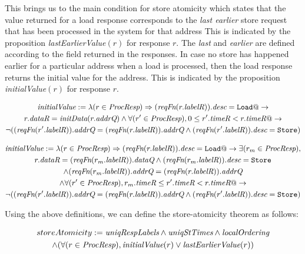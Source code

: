 This brings us to the main condition for store atomicity which states that the
value returned for a load response corresponds to the \emph{last earlier} store
request that has been processed in the system for that address This is
indicated by the proposition \textit{lastEarlierValue}$(r)$ for response $r$.
The \emph{last} and \emph{earlier} are defined according to the field \timeR{}
returned in the responses. In case no store has happened earlier for a
particular address when a load is processed, then the load response returns the
initial value for the address. This is indicated by the proposition
\textit{initialValue}$(r)$ for response $r$.
\begin{defn}
\small
\begin{multline*}
\textit{initialValue} := \lambda (r \in \textit{ProcResp}) \Rightarrow
(\textit{reqFn} (r.\textit{labelR})).\textit{desc} = \texttt{Load} @->\\ r.\textit{dataR} = \textit{initData} (r.\textit{addrQ}) \wedge 
\forall (r' \in \textit{ProcResp}), 0 \le r'.\textit{timeR} < r.\textit{timeR} @->\\
\neg ((\textit{reqFn} (r'.\textit{labelR})).\textit{addrQ} = (\textit{reqFn} (r.\textit{labelR})).\textit{addrQ} \wedge (\textit{reqFn} (r'.\textit{labelR})).\textit{desc} = \texttt{Store})
\end{multline*}
\end{defn}

\begin{defn}
\small
\begin{multline*}
\textit{initialValue} := \lambda (r \in \textit{ProcResp}) \Rightarrow
(\textit{reqFn} (r.\textit{labelR})).\textit{desc} = \texttt{Load} @->
\exists (r_m \in \textit{ProcResp}),\\ r.\textit{dataR} = (\textit{reqFn} (r_m.\textit{labelR})).\textit{dataQ} \wedge 
(\textit{reqFn} (r_m.\textit{labelR})).\textit{desc} = \texttt{Store} \\ \wedge (\textit{reqFn} (r_m.\textit{labelR})).\textit{addrQ} = (\textit{reqFn} (r.\textit{labelR})).\textit{addrQ}\\ \wedge
\forall (r' \in \textit{ProcResp}), r_m.\textit{timeR} \le r'.\textit{timeR} < r.\textit{timeR} @->\\
\neg ((\textit{reqFn} (r'.\textit{labelR})).\textit{addrQ} = (\textit{reqFn} (r.\textit{labelR})).\textit{addrQ} \wedge (\textit{reqFn} (r'.\textit{labelR})).\textit{desc} = \texttt{Store})
\end{multline*}
\end{defn}

Using the above definitions, we can define the store-atomicity theorem as follows:
\begin{thm}
\small
\begin{multline*}
storeAtomicity := 
\textit{uniqRespLabels} \wedge
\textit{uniqStTimes} \wedge \textit{localOrdering}\\ \wedge 
(\forall (r \in \textit{ProcResp}), \textit{initialValue}(r) \vee \textit{lastEarlierValue}(r))
\end{multline*}
\end{thm}
